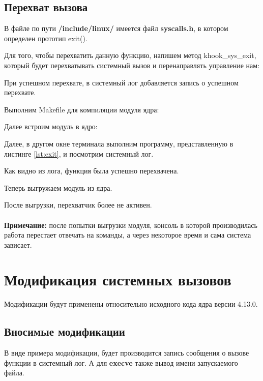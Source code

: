 \subsection{Перехват вызова}
В файле по пути \textbf{/include/linux/} имеется файл \textbf{syscalls.h}, в котором определен прототип exit().

Для того, чтобы перехватить данную функцию, напишем метод khook\_sys\_exit, который будет перехватывать системный вызов и перенаправлять управление нам:


При успешном перехвате, в системный лог добавляется запись о успешном перехвате.

Выполним Makefile для компиляции модуля ядра:

Далее встроим модуль в ядро:

Далее, в другом окне терминала выполним программу, представленную в листинге \ref{lst:exit}, и посмотрим системный лог.

Как видно из лога, функция была успешно перехвачена.

Теперь выгружаем модуль из ядра.

После выгрузки, перехватчик более не активен.\\\\
\textbf{Примечание:} после попытки выгрузки модуля, консоль в которой производилась работа перестает отвечать на команды, а через некоторое время и сама система зависает.

\section{Модификация системных вызовов}
Модификации будут применены относительно исходного кода ядра версии 4.13.0.
\subsection{Вносимые модификации}
В виде примера модификации, будет производится запись сообщения о вызове функции в системный лог. А для \textbf{execve} также вывод имени запускаемого файла.
